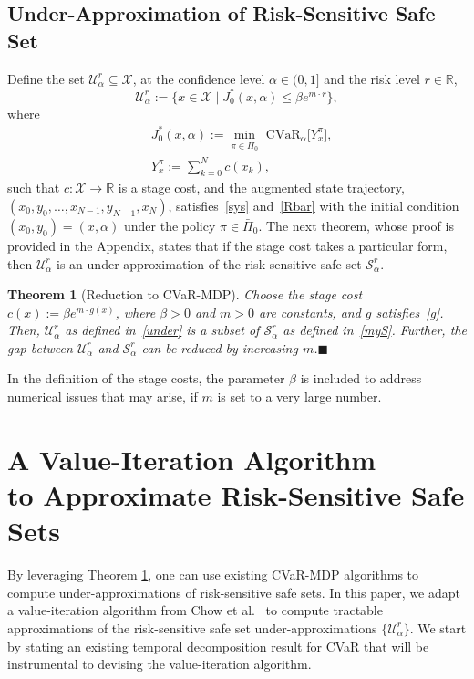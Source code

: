 \documentclass[letterpaper, 10 pt, conference]{ieeeconf}  %
\newtheorem{theorem}{Theorem}
\begin{document}
\subsection{Under-Approximation of Risk-Sensitive Safe Set}
Define the set $\mathcal{U}_\alpha^r \subseteq \mathcal{X}$,
at the confidence level $\alpha \in (0,1]$ and the risk level $r \in \mathbb{R}$,
%
\begin{equation}\label{under}
\mathcal{U}_\alpha^r := \{x \in \mathcal{X} \mid J_0^*(x,\alpha) \leq \beta e^{m\cdot r} \},
\end{equation}
%
where
%
\begin{equation}\begin{aligned}
& J_0^*(x,\alpha) := {\underset{\pi \in \bar{\Pi}_0}\min} \text{ CVaR}_\alpha \big[ Y_x^\pi \big],\\
& Y_x^\pi := \textstyle\sum_{k=0}^N c(x_k),
\end{aligned}\label{J0}\end{equation}
%
such that $c : \mathcal{X} \to \mathbb{R}$ is a stage cost, and the augmented state trajectory, $(x_0, y_0, \dots, x_{N-1}, y_{N-1}, x_N)$,
satisfies~\eqref{sys} and~\eqref{Rbar} with the initial condition $(x_0, y_0) = (x, \alpha)$ under the policy $\pi \in \bar{\Pi}_0$.
The next theorem, whose proof is provided in the Appendix, states that if the stage cost takes a particular form, then $\mathcal{U}_\alpha^r$ is an under-approximation of the risk-sensitive safe set $\mathcal{S}_\alpha^r$.   
\begin{theorem}[Reduction to CVaR-MDP]\label{lemma2}
Choose the stage cost $c(x) := \beta e^{m\cdot g(x)}$, where $\beta > 0$ and $m > 0$ are constants, and $g$ satisfies~\eqref{g}.
Then, $\mathcal{U}_\alpha^r$ as defined in~\eqref{under} is a subset of $\mathcal{S}_\alpha^r$ as defined in~\eqref{myS}. 
Further, the gap between $\mathcal{U}_\alpha^r$ and $\mathcal{S}_\alpha^r$ can be reduced by increasing $m$.\hspace{6em}$\blacksquare$ \end{theorem}

In the definition of the stage costs, the parameter $\beta$ is included to address numerical issues that may arise, if $m$ is set to a very large number.
%
%
%
\section{A Value-Iteration Algorithm \\to Approximate Risk-Sensitive Safe Sets}\label{sec::alg}
By leveraging Theorem \ref{lemma2}, one can use existing CVaR-MDP algorithms to compute under-approximations of risk-sensitive safe sets. 
In this paper, we adapt a value-iteration algorithm from Chow et al.~\cite{chow2015risk} to compute tractable approximations 
of the risk-sensitive safe set under-approximations $\{\mathcal{U}_{\alpha}^r\}$. 
We start by stating an existing temporal decomposition result for CVaR that will be instrumental to devising the value-iteration algorithm. 
%
\end{document}
